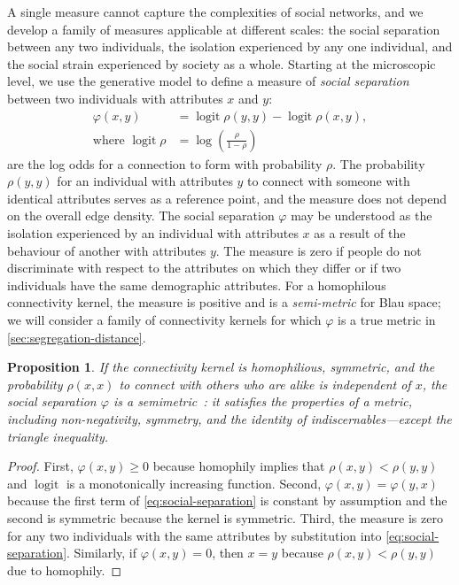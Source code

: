\documentclass{scrartcl}
\DeclareMathOperator{\logit}{logit}
\newtheorem{prop}{Proposition}
\begin{document}
A single measure cannot capture the complexities of social networks, and we develop a family of measures applicable at different scales: the social separation between any two individuals, the isolation experienced by any one individual, and the social strain experienced by society as a whole. Starting at the microscopic level, we use the generative model to define a measure of \emph{social separation} between two individuals with attributes $x$ and $y$:
\begin{align}
    \varphi(x, y) &= \logit \rho(y,y) - \logit\rho(x,y),\label{eq:social-separation}\\
    \text{where }\logit\rho &= \log\left(\frac{\rho}{1-\rho}\right)\nonumber
\end{align}
are the log odds for a connection to form with probability $\rho$. The probability $\rho(y, y)$ for an individual with attributes $y$ to connect with someone with identical attributes serves as a reference point, and the measure does not depend on the overall edge density. The social separation $\varphi$ may be understood as the isolation experienced by an individual with attributes $x$ as a result of the behaviour of another with attributes $y$. The measure is zero if people do not discriminate with respect to the attributes on which they differ or if two individuals have the same demographic attributes.
For a homophilous connectivity kernel, the measure is positive and is a \emph{semi-metric} for Blau space; we will consider a family of connectivity kernels for which $\varphi$ is a true metric in \cref{sec:segregation-distance}.

\begin{prop}\label{prop:segregations-semi-metric}
    If the connectivity kernel is homophilious, symmetric, and the probability $\rho(x,x)$ to connect with others who are alike is independent of $x$, the social separation $\varphi$ is a \emph{semimetric}~\cite{Wilson1931}: it satisfies the properties of a metric, including non-negativity, symmetry, and the identity of indiscernables---except the triangle inequality.
\end{prop}
\begin{proof}
    First, $\varphi(x,y)\geq0$ because homophily implies that $\rho(x, y)<\rho(y, y)$ and $\logit$ is a monotonically increasing function. Second, $\varphi(x,y)=\varphi(y,x)$ because the first term of \cref{eq:social-separation} is constant by assumption and the second is symmetric because the kernel is symmetric. Third, the measure is zero for any two individuals with the same attributes by substitution into \cref{eq:social-separation}. Similarly, if $\varphi(x,y)=0$, then $x=y$ because $\rho(x, y)<\rho(y, y)$ due to homophily.
\end{proof}
\end{document}
